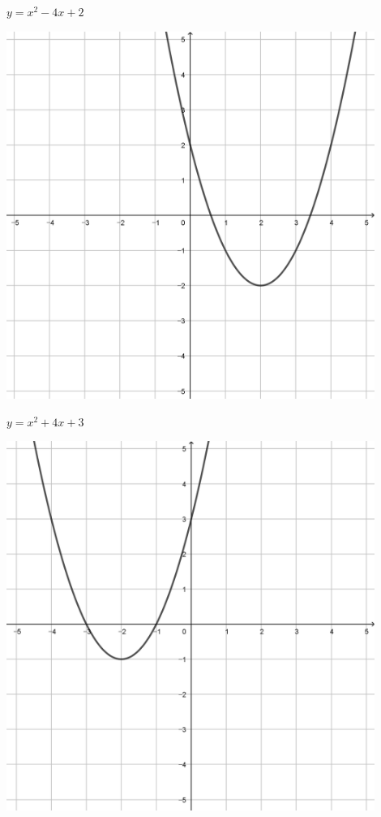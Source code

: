\documentclass[a4paper]{oblivoir}
\begin{document}
\begin{minipage}{0.45\textwidth}\centering
\(y=x^2-4x+2\)
\par\bigskip\includegraphics[width=0.9\textwidth]{img/2_quadratic_23}
\end{minipage}
\begin{minipage}{0.45\textwidth}\centering
\(y=x^2+4x+3\)
\par\bigskip\includegraphics[width=0.9\textwidth]{img/2_quadratic_24}
\end{minipage}\bigskip\bigskip\par
\end{document}
